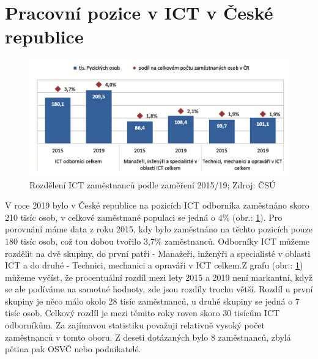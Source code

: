 \documentclass[12pt]{report}			%
\begin{document}
    
    	\section{Pracovní pozice v ICT v České republice}
            \begin{figure}[h]
                \centering
                 \includegraphics[width=16cm]{Maturitni Prace/images/odbornici_pocet.png}  
                 \caption[Rozdělení ICT zaměstnanců podle zaměření 2015/19]{Rozdělení ICT zaměstnanců podle zaměření 2015/19; Zdroj: ČSÚ}
                 \label{fig:odbornici_pocet}
            \end{figure}
            
            V roce 2019 bylo v České republice na pozicích ICT odborníka zaměstnáno skoro 210 tisíc osob, v celkové zaměstnané populaci se jedná o 4\% (obr.: \ref{fig:odbornici_pocet}). Pro porovnání máme data z roku 2015, kdy bylo zaměstnáno na těchto pozicích pouze 180 tisíc osob, což tou dobou tvořilo 3,7\% zaměstnanců. Odborníky ICT můžeme rozdělit na dvě skupiny, do první patří - Manažeři, inženýři a specialisté v oblasti ICT a do druhé - Technici, mechanici a opraváři v ICT celkem.Z grafu (obr.: \ref{fig:odbornici_pocet}) můžeme vyčíst, že procentuální rozdíl mezi lety 2015 a 2019 není markantní, když se ale podíváme na samotné hodnoty, zde jsou rozdíly trochu větší. Rozdíl u první skupiny je něco málo okolo 28 tisíc zaměstnanců, u druhé skupiny se jedná o 7 tisíc osob. Celkový rozdíl je mezi těmito roky roven skoro 30 tisícům ICT odborníkům. Za zajímavou statistiku považuji relativně vysoký počet zaměstnanců v tomto oboru. Z deseti dotázaných bylo 8 zaměstnanců, zbylá pětina pak OSVČ nebo podnikatelé.\cite{LidskeZdrojeVIT}
            
\end{document}
